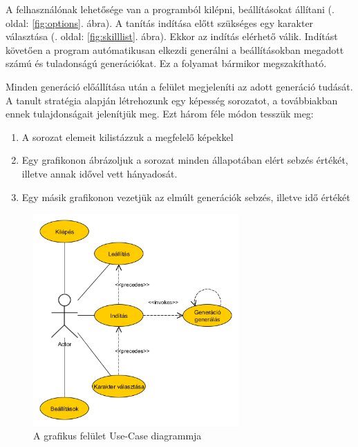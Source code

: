 \documentclass[12pt]{article}
\begin{document}
	A felhasználónak lehetősége van a programból kilépni, beállításokat állítani (\pageref{fig:options}. oldal: \ref{fig:options}. ábra). A tanítás indítása előtt szükséges egy karakter választása (\pageref{fig:skilllist}. oldal: \ref{fig:skilllist}. ábra). Ekkor az indítás elérhető válik. Indítást követően a program autómatikusan elkezdi generálni a beállításokban megadott számú és tuladonságú generációkat. Ez a folyamat bármikor megszakítható.
	
	Minden generáció előállítása után a felület megjeleníti az adott generáció tudását. A tanult stratégia alapján létrehozunk egy képesség sorozatot, a továbbiakban ennek tulajdonságait jelenítjük meg. Ezt három féle módon tesszük meg:
	
	\begin{enumerate}
		\item A sorozat elemeit kilistázzuk a megfelelő képekkel
		\item Egy grafikonon ábrázoljuk a sorozat minden állapotában elért sebzés értékét, illetve annak idővel vett hányadosát.
		\item Egy másik grafikonon vezetjük az elmúlt generációk sebzés, illetve idő értékét
	\end{enumerate}
	
	\begin{figure}[H]
		\begin{center}
			\includegraphics[width=0.7\textwidth]{usecase}
		\end{center}
		\caption{A grafikus felület Use-Case diagrammja}
		\label{fig:usecase}
	\end{figure}
	
\end{document}

